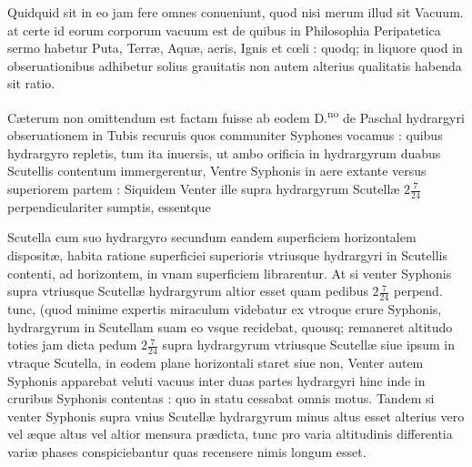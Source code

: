 \documentclass[11pt,a4paper]{article}
\begin{document}
Quidquid sit in eo jam fere omnes conueniunt, quod nisi merum illud sit Vacuum. at certe id eorum corporum vacuum est de quibus in Philosophia Peripatetica sermo habetur Puta, Terræ, Aquæ, aeris, Ignis et cœli : quodq; in liquore quod in obseruationibus adhibetur solius grauitatis non autem alterius qualitatis habenda sit ratio.

Cæterum non omittendum est factam fuisse ab eodem D.\textsuperscript{no} de Paschal hydrargyri obseruationem in Tubis recuruis quos communiter Syphones vocamus : quibus hydrargyro repletis, tum ita inuersis, ut ambo orificia in hydrargyrum duabus Scutellis contentum immergerentur, Ventre Syphonis in aere extante versus superiorem partem : Siquidem Venter ille supra hydrargyrum Scutellæ   $2\frac{7}{24}$ perpendiculariter sumptis, essentque


Scutella cum suo hydrargyro secundum eandem superficiem horizontalem dispositæ, habita ratione superficiei superioris vtriusque hydrargyri in Scutellis contenti, ad horizontem, in vnam superficiem librarentur. At si venter Syphonis supra vtriusque Scutellæ hydrargyrum altior esset quam pedibus $2\frac{7}{24}$ perpend. tunc, (quod minime expertis miraculum videbatur ex vtroque crure Syphonis, hydrargyrum in Scutellam suam eo vsque recidebat, quousq; remaneret altitudo toties jam dicta pedum $2\frac{7}{24}$ supra hydrargyrum vtriusque Scutellæ siue ipsum in vtraque Scutella, in eodem plane horizontali staret siue non, Venter autem Syphonis apparebat veluti vacuus inter duas partes hydrargyri hinc inde in cruribus Syphonis contentas : quo in statu cessabat omnis motus. Tandem si venter Syphonis supra vnius Scutellæ hydrargyrum minus altus esset alterius vero vel æque altus vel altior mensura prædicta, tunc pro varia altitudinis differentia variæ phases conspiciebantur quas recensere nimis longum esset.
\end{document}
